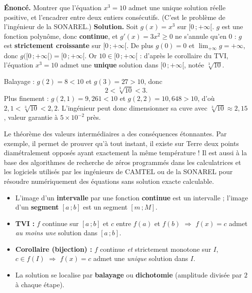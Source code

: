 \documentclass[11pt]{article}
\begin{document}
\begin{exoresolu}
\textbf{Énoncé.} Montrer que l'équation $x^{3} = 10$ admet une unique solution réelle positive, et l'encadrer entre deux entiers consécutifs. (C'est le problème de l'ingénieur de la SONAREL.)
\tcblower
\textbf{Solution.} Soit $g(x) = x^{3}$ sur $[0\,;+\infty[$. $g$ est une fonction polynôme, donc \textbf{continue}, et $g'(x) = 3x^{2} \geq 0$ ne s'annule qu'en $0$ : $g$ est \textbf{strictement croissante} sur $[0\,;+\infty[$. De plus $g(0) = 0$ et $\lim_{+\infty} g = +\infty$, donc $g\big([0\,;+\infty[\big) = [0\,;+\infty[$. Or $10 \in [0\,;+\infty[$ : d'après le corollaire du TVI, l'équation $x^{3} = 10$ admet une \textbf{unique} solution dans $[0\,;+\infty[$, notée $\sqrt[3]{10}$.

Balayage : $g(2) = 8 < 10$ et $g(3) = 27 > 10$, donc
\[ 2 < \sqrt[3]{10} < 3. \]
Plus finement : $g(2{,}1) = 9{,}261 < 10$ et $g(2{,}2) = 10{,}648 > 10$, d'où $2{,}1 < \sqrt[3]{10} < 2{,}2$. L'ingénieur peut donc dimensionner sa cuve avec $\sqrt[3]{10} \approx 2{,}15$, valeur garantie à $5 \times 10^{-2}$ près.
\end{exoresolu}

\begin{savaistu}
Le théorème des valeurs intermédiaires a des conséquences étonnantes. Par exemple, il permet de prouver qu'à tout instant, il existe sur Terre deux points diamétralement opposés ayant exactement la même température ! Il est aussi à la base des algorithmes de recherche de zéros programmés dans les calculatrices et les logiciels utilisés par les ingénieurs de CAMTEL ou de la SONAREL pour résoudre numériquement des équations sans solution exacte calculable.
\end{savaistu}

\begin{aretenir}
\begin{itemize}
\item L'image d'un \textbf{intervalle} par une fonction \textbf{continue} est un intervalle ; l'image d'un \textbf{segment} $[a\,;b]$ est un segment $[m\,;M]$.
\item \textbf{TVI :} $f$ continue sur $[a\,;b]$ et $c$ entre $f(a)$ et $f(b)$ $\Rightarrow$ $f(x) = c$ admet \emph{au moins une} solution dans $[a\,;b]$.
\item \textbf{Corollaire (bijection) :} $f$ continue \emph{et} strictement monotone sur $I$, $c \in f(I)$ $\Rightarrow$ $f(x) = c$ admet une \emph{unique} solution dans $I$.
\item La solution se localise par \textbf{balayage} ou \textbf{dichotomie} (amplitude divisée par $2$ à chaque étape).
\end{itemize}
\end{aretenir}
\end{document}
